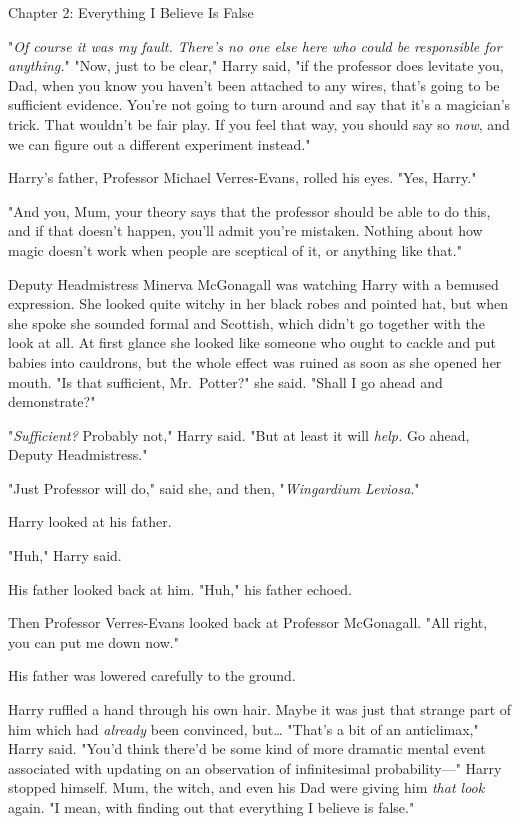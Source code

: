 
Chapter 2: Everything I Believe Is False

\sbreak
"\emph{Of course it was my fault. There's no one else here who could be 
responsible for anything.}"
\sbreak
"Now, just to be clear," Harry said, "if the professor does levitate you, Dad, 
when you know you haven't been attached to any wires, that's going to be 
sufficient evidence. You're not going to turn around and say that it's a 
magician's trick. That wouldn't be fair play. If you feel that way, you should 
say so \emph{now}, and we can figure out a different experiment instead."

Harry's father, Professor Michael Verres-Evans, rolled his eyes. "Yes, Harry."

"And you, Mum, your theory says that the professor should be able to do this, 
and if that doesn't happen, you'll admit you're mistaken. Nothing about how 
magic doesn't work when people are sceptical of it, or anything like that."

Deputy Headmistress Minerva McGonagall was watching Harry with a bemused 
expression. She looked quite witchy in her black robes and pointed hat, but 
when she spoke she sounded formal and Scottish, which didn't go together with 
the look at all. At first glance she looked like someone who ought to cackle 
and put babies into cauldrons, but the whole effect was ruined as soon as she 
opened her mouth. "Is that sufficient, Mr.~Potter?" she said. "Shall I go ahead 
and demonstrate?"

"\emph{Sufficient?} Probably not," Harry said. "But at least it will 
\emph{help.} Go ahead, Deputy Headmistress."

"Just Professor will do," said she, and then, "\emph{Wingardium Leviosa}."

Harry looked at his father.

"Huh," Harry said.

His father looked back at him. "Huh," his father echoed.

Then Professor Verres-Evans looked back at Professor McGonagall. "All right, 
you can put me down now."

His father was lowered carefully to the ground.

Harry ruffled a hand through his own hair. Maybe it was just that strange part 
of him which had \emph{already} been convinced, but{\ldots} "That's a bit of an 
anticlimax," Harry said. "You'd think there'd be some kind of more dramatic 
mental event associated with updating on an observation of infinitesimal 
probability---" Harry stopped himself. Mum, the witch, and even his Dad were 
giving him \emph{that look} again. "I mean, with finding out that everything I 
believe is false."

